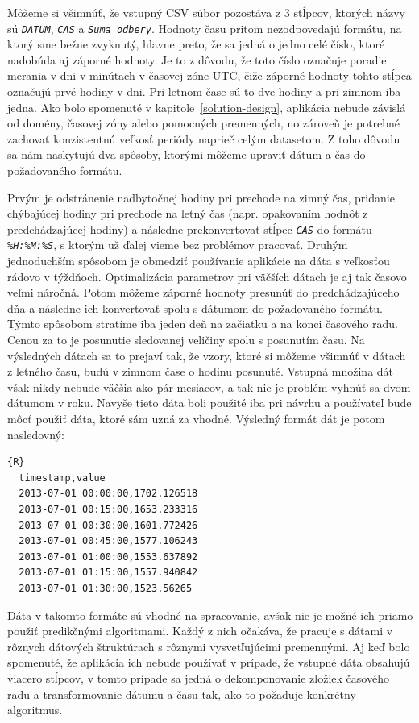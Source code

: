 \documentclass[a4paper,slovak,12pt,appendix]{article}
\begin{document}
Môžeme si všimnúť, že vstupný CSV súbor pozostáva z 3 stĺpcov, ktorých názvy sú \texttt{\textit{DATUM}}, \texttt{\textit{CAS}}
a \texttt{\textit{Suma\_odbery}}. Hodnoty času pritom nezodpovedajú formátu, na ktorý sme
bežne zvyknutý, hlavne preto, že sa jedná o jedno celé číslo, ktoré nadobúda aj
záporné hodnoty. Je to z dôvodu, že toto číslo označuje poradie merania v dni
v minútach v časovej zóne UTC, čiže záporné hodnoty tohto stĺpca označujú prvé
hodiny v dni. Pri letnom čase sú to dve hodiny a pri zimnom iba jedna. Ako bolo
spomenuté v kapitole~\ref{solution-design}, aplikácia nebude závislá od domény,
časovej zóny alebo pomocných premenných, no zároveň je potrebné zachovať
konzistentnú veľkosť periódy naprieč celým datasetom. Z toho dôvodu sa nám
naskytujú dva spôsoby, ktorými môžeme upraviť dátum a čas do požadovaného
formátu.

Prvým je odstránenie nadbytočnej hodiny pri prechode na zimný čas,
pridanie chýbajúcej hodiny pri prechode na letný čas (napr. opakovaním hodnôt
z predchádzajúcej hodiny) a následne prekonvertovať stĺpec \texttt{\textit{CAS}}  do formátu
\texttt{\textit{\%H:\%M:\%S}}, s ktorým už ďalej vieme bez problémov pracovať. Druhým
jednoduchším spôsobom je obmedziť používanie aplikácie na dáta s veľkosťou
rádovo v týždňoch. Optimalizácia parametrov pri väčších dátach je aj tak časovo
veľmi náročná. Potom môžeme záporné hodnoty presunúť do predchádzajúceho dňa
a následne ich konvertovať spolu s dátumom do požadovaného formátu. Týmto
spôsobom stratíme iba jeden deň na začiatku a na konci časového radu. Cenou za
to je posunutie sledovanej veličiny spolu s posunutím času. Na výsledných dátach
sa to prejaví tak, že vzory, ktoré si môžeme všimnúť v dátach z letného času,
budú v zimnom čase o hodinu posunuté. Vstupná množina dát však nikdy nebude
väčšia ako pár mesiacov, a tak nie je problém vyhnúť sa dvom dátumom v roku.
Navyše tieto dáta boli použité iba pri návrhu a používateľ bude môcť použiť
dáta, ktoré sám uzná za vhodné. Výsledný formát dát je potom nasledovný:

\begin{lstlisting}{R}
  timestamp,value
  2013-07-01 00:00:00,1702.126518
  2013-07-01 00:15:00,1653.233316
  2013-07-01 00:30:00,1601.772426
  2013-07-01 00:45:00,1577.106243
  2013-07-01 01:00:00,1553.637892
  2013-07-01 01:15:00,1557.940842
  2013-07-01 01:30:00,1523.56265
\end{lstlisting}

Dáta v takomto formáte sú vhodné na spracovanie, avšak nie je možné ich priamo
použiť predikčnými algoritmami. Každý z nich očakáva, že pracuje s dátami
v rôznych dátových štruktúrach s rôznymi vysvetľujúcimi premennými. Aj keď bolo
spomenuté, že aplikácia ich nebude používať v prípade, že vstupné dáta obsahujú
viacero stĺpcov, v tomto prípade sa jedná o dekomponovanie zložiek časového radu
a transformovanie dátumu a času tak, ako to požaduje konkrétny algoritmus.
\end{document}
